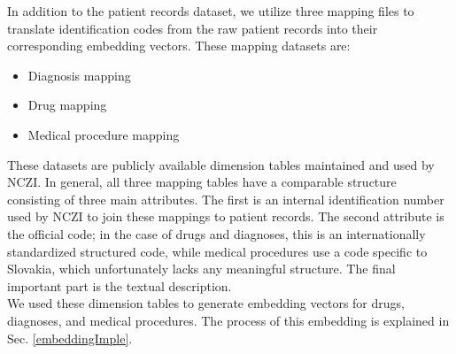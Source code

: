 In addition to the patient records dataset, we utilize three mapping files to translate identification codes from the raw patient records into their corresponding embedding vectors. These mapping datasets are:

\begin{itemize}
	\item Diagnosis mapping
	\item Drug mapping
	\item Medical procedure mapping
\end{itemize}

These datasets are publicly available dimension tables maintained and used by NCZI. In general, all three mapping tables have a comparable structure consisting of three main attributes. The first is an internal identification number used by NCZI to join these mappings to patient records. The second attribute is the official code; in the case of drugs and diagnoses, this is an internationally standardized structured code, while medical procedures use a code specific to Slovakia, which unfortunately lacks any meaningful structure. The final important part is the textual description.
\\

We used these dimension tables to generate embedding vectors for drugs, diagnoses, and medical procedures. The process of this embedding is explained in Sec. \ref{embeddingImple}.

